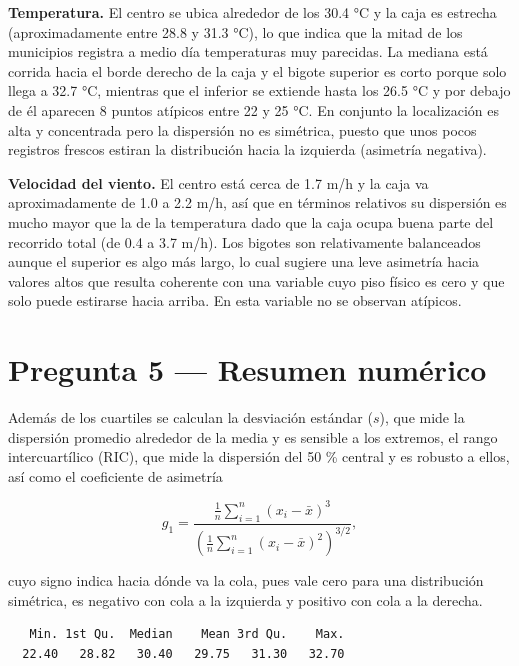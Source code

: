 \documentclass[oneside, openany, fontset=libertinus]{mitthesis}
\newenvironment{Shaded}{\begin{snugshade}}{\end{snugshade}}
\newcommand{\FunctionTok}[1]{\textcolor[rgb]{0.28,0.35,0.67}{#1}}
\newcommand{\NormalTok}[1]{\textcolor[rgb]{0.00,0.23,0.31}{#1}}
\newcommand{\SpecialCharTok}[1]{\textcolor[rgb]{0.37,0.37,0.37}{#1}}
\begin{document}
\textbf{Temperatura.} El centro se ubica alrededor de los 30.4 °C y la
caja es estrecha (aproximadamente entre 28.8 y 31.3 °C), lo que indica
que la mitad de los municipios registra a medio día temperaturas muy
parecidas. La mediana está corrida hacia el borde derecho de la caja y
el bigote superior es corto porque solo llega a 32.7 °C, mientras que el
inferior se extiende hasta los 26.5 °C y por debajo de él aparecen 8
puntos atípicos entre 22 y 25 °C. En conjunto la localización es alta y
concentrada pero la dispersión no es simétrica, puesto que unos pocos
registros frescos estiran la distribución hacia la izquierda (asimetría
negativa).

\textbf{Velocidad del viento.} El centro está cerca de 1.7 m/h y la caja
va aproximadamente de 1.0 a 2.2 m/h, así que en términos relativos su
dispersión es mucho mayor que la de la temperatura dado que la caja
ocupa buena parte del recorrido total (de 0.4 a 3.7 m/h). Los bigotes
son relativamente balanceados aunque el superior es algo más largo, lo
cual sugiere una leve asimetría hacia valores altos que resulta
coherente con una variable cuyo piso físico es cero y que solo puede
estirarse hacia arriba. En esta variable no se observan atípicos.

\section{Pregunta 5 --- Resumen numérico}\label{p5}

Además de los cuartiles se calculan la desviación estándar (\(s\)), que
mide la dispersión promedio alrededor de la media y es sensible a los
extremos, el rango intercuartílico (RIC), que mide la dispersión del 50
\% central y es robusto a ellos, así como el coeficiente de asimetría

\[
g_1 = \frac{\frac{1}{n}\sum_{i=1}^{n}(x_i - \bar{x})^3}
           {\left(\frac{1}{n}\sum_{i=1}^{n}(x_i - \bar{x})^2\right)^{3/2}},
\]

cuyo signo indica hacia dónde va la cola, pues vale cero para una
distribución simétrica, es negativo con cola a la izquierda y positivo
con cola a la derecha.

\begin{Shaded}
\end{Shaded}

\begin{verbatim}
   Min. 1st Qu.  Median    Mean 3rd Qu.    Max. 
  22.40   28.82   30.40   29.75   31.30   32.70 
\end{verbatim}
\end{document}
